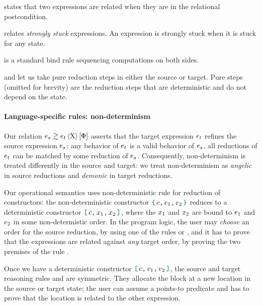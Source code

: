  states that two expressions are related when they are in the relational postcondition.

 relates \emph{strongly stuck} expressions.
An expression is strongly stuck when it is stuck for any state.

 is a standard bind rule sequencing computations on both sides.

 and  let us take pure reduction steps in either the source or target.
Pure steps (omitted for brevity) are the reduction steps that are deterministic and do not depend on the state.

\paragraph{Language-specific rules: non-determinism}
Our relation $\iSim[\iProt]{\iPred}{\datalangExpr_s}{\datalangExpr_t}$ asserts that the target expression $\datalangExpr_t$ refines the source expression $\datalangExpr_s$: any behavior of $\datalangExpr_t$ is a valid behavior of $\datalangExpr_s$, all reductions of $\datalangExpr_t$ can be matched by some reduction of $\datalangExpr_s$.
Consequently, non-determinism is treated differently in the source and target: we treat non-determinism as \emph{angelic} in source reductions and \emph{demonic} in target reductions.

Our operational semantics uses non-deterministic rule for reduction of constructors: the non-deterministic constructor $\datalangBlock{c}{\datalangExpr_1}{\datalangExpr_2}$ reduces to a deterministic constructor $\datalangBlockDet{c}{\datalangVar_1}{\datalangVar_2}$, where the $\datalangVar_1$ and $\datalangVar_2$ are bound to $\datalangExpr_1$ and $\datalangExpr_2$ in some non-determistic order.
In the program logic, the user may \emph{choose} an order for the source reduction, by using one of the rules  or , and it has to prove that the expressions are related against \emph{any} target order, by proving the two premises of the rule .

Once we have a deterministic constructor $\datalangBlockDet{c}{\datalangVal_1}{\datalangVal_2}$, the source and target reasoning rules  and  are symmetric.
They allocate the block at a new location in the source or target state; the user can assume a points-to predicate and has to prove that the location is related to the other expression.

